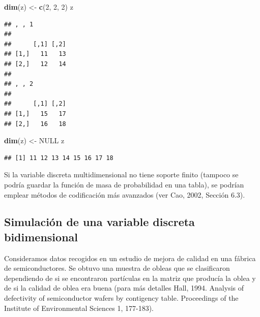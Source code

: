 \documentclass[
]{book}
\newenvironment{Shaded}{\begin{snugshade}}{\end{snugshade}}
\newcommand{\DecValTok}[1]{\textcolor[rgb]{0.00,0.00,0.81}{#1}}
\newcommand{\KeywordTok}[1]{\textcolor[rgb]{0.13,0.29,0.53}{\textbf{#1}}}
\newcommand{\NormalTok}[1]{#1}
\newcommand{\OtherTok}[1]{\textcolor[rgb]{0.56,0.35,0.01}{#1}}
\newcommand{\StringTok}[1]{\textcolor[rgb]{0.31,0.60,0.02}{#1}}
\theoremstyle{break}
\theoremstyle{definition}
\theoremstyle{definition}
\theoremstyle{definition}
\theoremstyle{remark}
\begin{document}
\begin{Shaded}
\begin{Highlighting}[]
\KeywordTok{dim}\NormalTok{(z) <-}\StringTok{ }\KeywordTok{c}\NormalTok{(}\DecValTok{2}\NormalTok{, }\DecValTok{2}\NormalTok{, }\DecValTok{2}\NormalTok{)}
\NormalTok{z}
\end{Highlighting}
\end{Shaded}

\begin{verbatim}
## , , 1
## 
##      [,1] [,2]
## [1,]   11   13
## [2,]   12   14
## 
## , , 2
## 
##      [,1] [,2]
## [1,]   15   17
## [2,]   16   18
\end{verbatim}

\begin{Shaded}
\begin{Highlighting}[]
\KeywordTok{dim}\NormalTok{(z) <-}\StringTok{ }\OtherTok{NULL}
\NormalTok{z}
\end{Highlighting}
\end{Shaded}

\begin{verbatim}
## [1] 11 12 13 14 15 16 17 18
\end{verbatim}

Si la variable discreta multidimensional no tiene soporte finito (tampoco se podría guardar la función de masa de probabilidad en una tabla), se podrían emplear métodos de codificación más avanzados (ver Cao, 2002, Sección 6.3).

\hypertarget{simulaciuxf3n-de-una-variable-discreta-bidimensional}{%
\subsection{Simulación de una variable discreta bidimensional}\label{simulaciuxf3n-de-una-variable-discreta-bidimensional}}

Consideramos datos recogidos en un estudio de mejora de calidad en una fábrica de semiconductores.
Se obtuvo una muestra de obleas que se clasificaron dependiendo de si se encontraron partículas en la matriz que producía la oblea y de si la calidad de oblea era buena (para más detalles Hall, 1994. Analysis of defectivity of semiconductor wafers by contigency table. Proceedings of the Institute of Environmental Sciences 1, 177-183).
\end{document}
